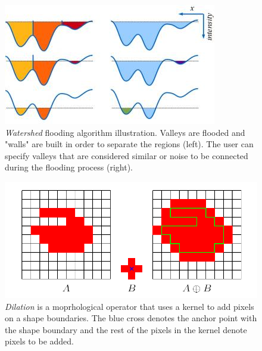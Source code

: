 \begin{figure}[t]
\centering
\includegraphics[width=0.7\columnwidth]{Chapter4/4/watershed.jpg}
\caption[Watershed flooding algorithm illustration.]{\textit{Watershed} flooding algorithm illustration. Valleys are flooded and "walls" are built in order to separate the regions (left). The user can specify valleys that are considered similar or noise to be connected during the flooding process (right).}
\label{fig:water-f}
\end{figure}

\begin{figure}[t]
\centering
\includegraphics[width=0.8\columnwidth]{Chapter4/4/dilation.png}
\caption[Dilation on a binary image.]{\textit{Dilation} is a moprhological operator that uses a kernel to add pixels on a shape boundaries. The blue cross denotes the anchor point with the shape boundary and the rest of the pixels in the kernel denote pixels to be added.}
\label{fig:dilation-f}
\end{figure}

